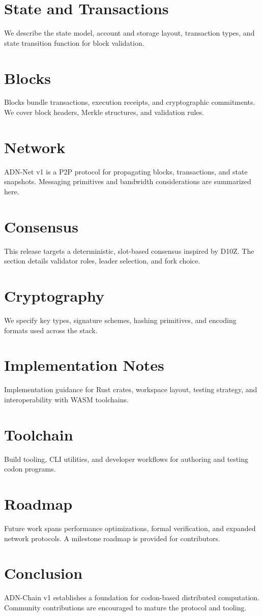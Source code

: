 \documentclass[11pt]{article}
\begin{document}
\section{State and Transactions}
We describe the state model, account and storage layout, transaction types, and
state transition function for block validation.

\section{Blocks}
Blocks bundle transactions, execution receipts, and cryptographic commitments.
We cover block headers, Merkle structures, and validation rules.

\section{Network}
ADN-Net v1 is a P2P protocol for propagating blocks, transactions, and state
snapshots. Messaging primitives and bandwidth considerations are summarized
here.

\section{Consensus}
This release targets a deterministic, slot-based consensus inspired by D10Z.
The section details validator roles, leader selection, and fork choice.

\section{Cryptography}
We specify key types, signature schemes, hashing primitives, and encoding
formats used across the stack.

\section{Implementation Notes}
Implementation guidance for Rust crates, workspace layout, testing strategy, and
interoperability with WASM toolchains.

\section{Toolchain}
Build tooling, CLI utilities, and developer workflows for authoring and testing
codon programs.

\section{Roadmap}
Future work spans performance optimizations, formal verification, and expanded
network protocols. A milestone roadmap is provided for contributors.

\section{Conclusion}
ADN-Chain v1 establishes a foundation for codon-based distributed computation.
Community contributions are encouraged to mature the protocol and tooling.
\end{document}
